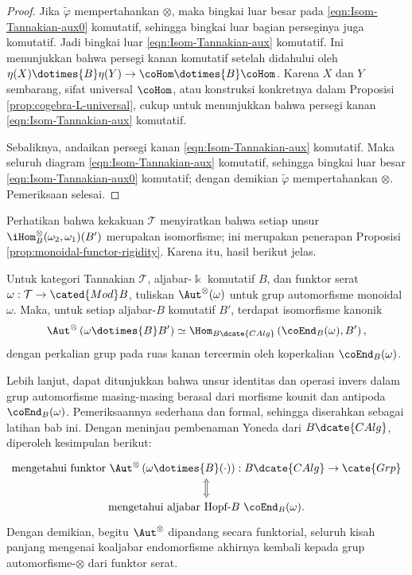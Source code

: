 \begin{proof}
	Jika $\tilde{\varphi}$ mempertahankan $\otimes$, maka bingkai luar besar pada \eqref{eqn:Isom-Tannakian-aux0} komutatif, sehingga bingkai luar bagian perseginya juga komutatif. Jadi bingkai luar \eqref{eqn:Isom-Tannakian-aux} komutatif. Ini menunjukkan bahwa persegi kanan komutatif setelah didahului oleh $\eta(X)\dotimes{B}\eta(Y)\to\coHom\dotimes{B}\coHom$. Karena $X$ dan $Y$ sembarang, sifat universal $\coHom$, atau konstruksi konkretnya dalam Proposisi \ref{prop:cogebra-L-universal}, cukup untuk menunjukkan bahwa persegi kanan \eqref{eqn:Isom-Tannakian-aux} komutatif.
	
	Sebaliknya, andaikan persegi kanan \eqref{eqn:Isom-Tannakian-aux} komutatif. Maka seluruh diagram \eqref{eqn:Isom-Tannakian-aux} komutatif, sehingga bingkai luar besar \eqref{eqn:Isom-Tannakian-aux0} komutatif; dengan demikian $\tilde{\varphi}$ mempertahankan $\otimes$. Pemeriksaan selesai.
\end{proof}

Perhatikan bahwa kekakuan $\mathcal{T}$ menyiratkan bahwa setiap unsur $\iHom^\otimes_B(\omega_2,\omega_1)(B')$ merupakan isomorfisme; ini merupakan penerapan Proposisi \ref{prop:monoidal-functor-rigidity}. Karena itu, hasil berikut jelas.

\begin{corollary}\label{prop:Aut-Tannakian}
	Untuk kategori Tannakian $\mathcal{T}$, aljabar-$\Bbbk$ komutatif $B$, dan
	funktor serat $\omega:\mathcal{T}\to\cated{Mod}B$, tuliskan
	$\Aut^{\otimes}(\omega)$ untuk grup automorfisme monoidal $\omega$. Maka,
	untuk setiap aljabar-$B$ komutatif $B'$, terdapat isomorfisme kanonik
	\[ \Aut^{\otimes}\left( \omega \dotimes{B} B' \right) \simeq \Hom_{B\dcate{CAlg}}\left(\coEnd_B(\omega), B' \right), \]
	dengan perkalian grup pada ruas kanan tercermin oleh koperkalian $\coEnd_B(\omega)$.
\end{corollary}

Lebih lanjut, dapat ditunjukkan bahwa unsur identitas dan operasi invers dalam grup automorfisme masing-masing berasal dari morfisme kounit dan antipoda $\coEnd_B(\omega)$. Pemeriksaannya sederhana dan formal, sehingga diserahkan sebagai latihan bab ini. Dengan meninjau pembenaman Yoneda dari $B\dcate{CAlg}$, diperoleh kesimpulan berikut:
\[\begin{tikzcd}
	\text{mengetahui funktor }\Aut^{\otimes}\left( \omega \dotimes{B} (\cdot)\right): B\dcate{CAlg} \to \cate{Grp} \arrow[Leftrightarrow, d] \\
	\text{mengetahui aljabar Hopf-$B$ }\coEnd_B(\omega).
\end{tikzcd}\]
Dengan demikian, begitu $\Aut^{\otimes}$ dipandang secara funktorial, seluruh kisah panjang mengenai koaljabar endomorfisme akhirnya kembali kepada grup automorfisme-$\otimes$ dari funktor serat.

